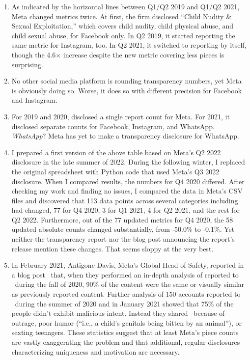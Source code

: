 \begin{enumerate}
\item As indicated by the horizontal lines between Q1/Q2 2019 and Q1/Q2 2021,
    Meta changed metrics twice. At first, the firm disclosed ``Child Nudity \&
    Sexual Exploitation,'' which covers child nudity, child physical abuse, and
    child sexual abuse, for Facebook only. In Q2 2019, it started reporting the
    same metric for Instagram, too. In Q2 2021, it switched to reporting \CSAM{}
    by itself, though the 4.6$\times$ increase despite the new metric covering
    less pieces is surprising.
\item No other social media platform is rounding transparency numbers, yet Meta
    is obviously doing so. Worse, it does so with different precision for
    Facebook and Instagram.
\item For 2019 and 2020, \NCMEC{} disclosed a single report count for Meta. For
    2021, it disclosed separate counts for Facebook, Instagram, and WhatsApp.
    \emph{WhatsApp}? Meta has yet to make a transparency disclosure for
    WhatsApp.
\item I prepared a first version of the above table based on Meta's Q2 2022
    disclosure in the late summer of 2022. During the following winter, I
    replaced the original spreadsheet with Python code that used Meta's Q3 2022
    disclosure. When I compared results, the numbers for Q4 2020 differed. After
    checking my work and finding no issues, I compared the data in Meta's CSV
    files and discovered that 113 data points across several categories
    including \CSAM{} had changed, 77 for Q4 2020, 3 for Q1 2021, 4 for Q2 2021,
    and the rest for Q2 2022. Furthermore, out of the 77 updated metrics for Q4
    2020, the 58 updated absolute counts changed substantially, from -50.0\% to
    -0.1\%. Yet neither the transparency report nor the blog post announcing the
    report's release mention these changes. That seems sloppy at the very best.
\item In February 2021, Antigone Davis, Meta's Global Head of Safety, reported
    in a blog post~\cite{Davis2021} that, when they performed an in-depth
    analysis of \CSAM reported to \NCMEC\ during the fall of 2020, 90\% of the
    content were the same or visually similar as previously reported content.
    Further analysis of 150 accounts reported to \NCMEC\ during the summer of
    2020 and in January 2021 showed that 75\% of the people didn't exhibit
    malicious intent. Instead they shared \CSAM\ because of outrage, poor humor
    (``i.e., a child's genitals being bitten by an animal''), or sexting
    teenagers. These statistics suggest that at least Meta's piece counts are
    vastly exaggerating the problem and that additional, regular disclosures
    characterizing uniqueness and motivation are necessary.
\end{enumerate}


